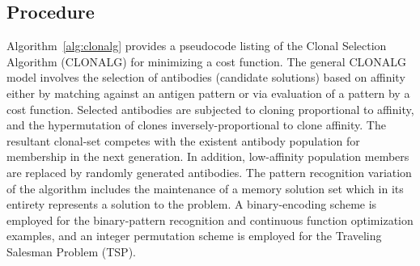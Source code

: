 \subsection{Procedure}
Algorithm~\ref{alg:clonalg} provides a pseudocode listing of the Clonal Selection Algorithm (CLONALG) for minimizing a cost function. 
The general CLONALG model involves the selection of antibodies (candidate solutions) based on affinity either by matching against an antigen pattern or via evaluation of a pattern by a cost function. Selected antibodies are subjected to cloning proportional to affinity, and the hypermutation of clones inversely-proportional to clone affinity. The resultant clonal-set competes with the existent antibody population for membership in the next generation. In addition, low-affinity population members are replaced by randomly generated antibodies. The pattern recognition variation of the algorithm includes the maintenance of a memory solution set which in its entirety represents a solution to the problem. A binary-encoding scheme is employed for the binary-pattern recognition and continuous function optimization examples, and an integer permutation scheme is employed for the Traveling Salesman Problem (TSP).

